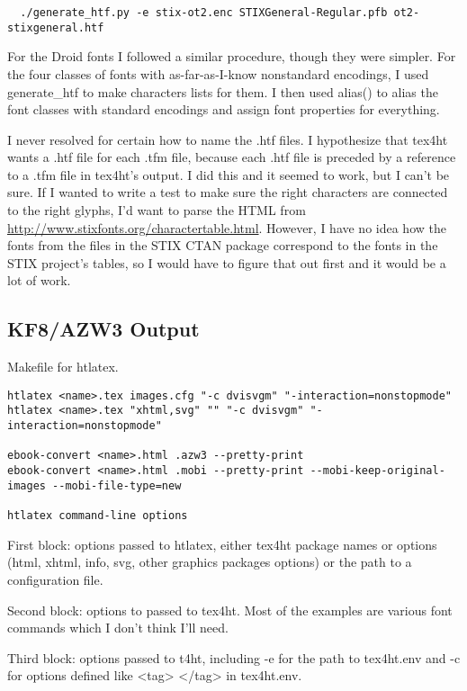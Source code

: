 \documentclass[12pt]{article}
\begin{document}
\begin{lstlisting}
  ./generate_htf.py -e stix-ot2.enc STIXGeneral-Regular.pfb ot2-stixgeneral.htf
\end{lstlisting}

For the Droid fonts I followed a similar procedure, though they were
simpler.  For the four classes of fonts with as-far-as-I-know
nonstandard encodings, I used generate\_htf to make characters lists
for them.  I then used alias() to alias the font classes with standard
encodings and assign font properties for everything.

I never resolved for certain how to name the .htf files.  I
hypothesize that tex4ht wants a .htf file for each .tfm file, because
each .htf file is preceded by a reference to a .tfm file in tex4ht's
output.  I did this and it seemed to work, but I can't be sure.  If I
wanted to write a test to make sure the right characters are connected
to the right glyphs, I'd want to parse the HTML from
\url{http://www.stixfonts.org/charactertable.html}. However, I have no
idea how the fonts from the files in the STIX CTAN package correspond
to the fonts in the STIX project's tables, so I would have to figure
that out first and it would be a lot of work.


\subsection{KF8/AZW3 Output}
\label{sec:kf8/azw3_output}

Makefile for htlatex.

\begin{lstlisting}
htlatex <name>.tex images.cfg "-c dvisvgm" "-interaction=nonstopmode"
htlatex <name>.tex "xhtml,svg" "" "-c dvisvgm" "-interaction=nonstopmode"

ebook-convert <name>.html .azw3 --pretty-print
ebook-convert <name>.html .mobi --pretty-print --mobi-keep-original-images --mobi-file-type=new

htlatex command-line options
\end{lstlisting}

First block: options passed to htlatex, either tex4ht package names or
options (html, xhtml, info, svg, other graphics packages options) or
the path to a configuration file.

Second block: options to passed to tex4ht.  Most of the examples are
various font commands which I don't think I'll need.

Third block: options passed to t4ht, including -e for the path to
tex4ht.env and -c for options defined like <tag> </tag> in
tex4ht.env.  
\end{document}
